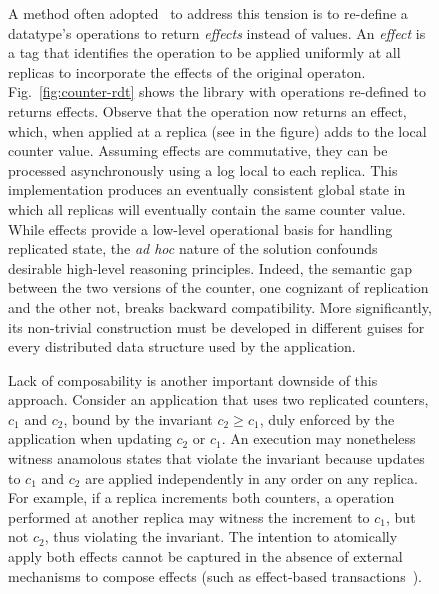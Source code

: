 \begin{figure}
A method often adopted~\cite{crdts, pldi15, gotsman-popl16} to address
this tension is to re-define a datatype's operations to return
\emph{effects} instead of values.  An \emph{effect} is a tag that
identifies the operation to be applied uniformly at all replicas to
incorporate the effects of the original
operaton. Fig.~\ref{fig:counter-rdt} shows the  library
with operations re-defined to returns effects.  Observe that the
 operation now returns an  effect, which,
when applied at a replica (see  in the figure) adds  to
the local counter value.  Assuming effects are commutative, they can
be processed asynchronously using a log local to each replica.  This
implementation produces an eventually consistent global state in which
all replicas will eventually contain the same counter value.  While
effects provide a low-level operational basis for handling replicated
state, the \emph{ad hoc} nature of the solution confounds desirable
high-level reasoning principles.  Indeed, the semantic gap between the
two versions of the counter, one cognizant of replication and the
other not, breaks backward compatibility.  More significantly, its
non-trivial construction must be developed in different guises for
every distributed data structure used by the application.

Lack of composability is another important downside of this approach.
Consider an application that uses two replicated counters, $c_1$ and
$c_2$, bound by the invariant $c_2 \ge c_1$, duly enforced by the
application when updating $c_2$ or $c_1$.  An execution may
nonetheless witness anamolous states that violate the invariant
because updates to $c_1$ and $c_2$ are applied independently in any
order on any replica.  For example, if a replica increments both
counters, a  operation performed at another replica may
witness the increment to $c_1$, but not $c_2$, thus violating the
invariant. The intention to atomically apply both effects cannot be
captured in the absence of external mechanisms to compose effects
(such as effect-based transactions~\cite{pldi15}).


\end{figure}
